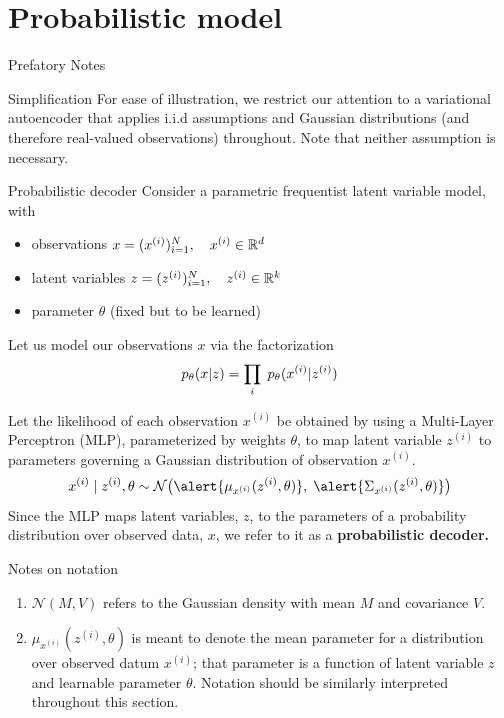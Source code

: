 \documentclass[10pt]{beamer}
\newcommand{\obs}{x^{(i)} }
\newcommand{\alatent}{z^{(i)} }
\newcommand{\N}{\mathcal{N}}
\begin{document}
\section{Probabilistic model}

\begin{frame}{Prefatory Notes}
\begin{sblock}{Simplification}
For ease of illustration, we restrict our attention to a variational autoencoder that applies i.i.d assumptions and Gaussian distributions (and therefore real-valued observations) throughout.    Note that neither assumption is necessary. 
\end{sblock}
\end{frame}


\begin{frame}{Probabilistic decoder}
\footnotesize
Consider a parametric frequentist latent variable model, with 
\begin{itemize}
\item observations $x = (\obs)_{i=1}^N, \quad \obs \in \R^d$
\item latent variables $z =(\alatent)_{i=1}^N, \quad \alatent \in \R^k$
\item parameter $\theta$ (fixed but to be learned)
\end{itemize}

Let us model our observations $x$ via the factorization
\[ p_\theta(x |z )= \ds\prod_i \; p_\theta( \obs | \alatent ) \] 
\pause 

Let the likelihood of each observation $\obs$ be obtained by using a Multi-Layer Perceptron (MLP), parameterized by weights $\theta$, to map latent variable $\alatent$ to \alert{parameters} governing a Gaussian distribution of observation $x^{(i)}$. \pause 
\begin{equation} x^{(i)} \cond \alatent, \theta \sim \N \big( \alert{\mu_{x^{(i)}}( \alatent, \theta)}, \; \alert{\Sigma_{x^{(i)}} (\alatent, \theta)} \big)  
\label{likelihood} 
\end{equation}
\pause
Since the MLP maps latent variables, $z$, to the parameters of a probability distribution over observed data, $x$, we refer to it as a \bf{probabilistic decoder.}

\vfill

\tiny  Notes on notation
\begin{enumerate}
\item $\N(M,V)$ refers to the Gaussian density with mean $M$ and covariance $V$.
\item $\mu_{\obs}(\alatent, \theta)$ is meant to denote the mean parameter for a distribution over observed datum $\obs$; that parameter is a function of latent variable $z$ and learnable parameter $\theta$. Notation should be similarly interpreted throughout this section.
\end{enumerate}

\end{frame}
\end{document}
